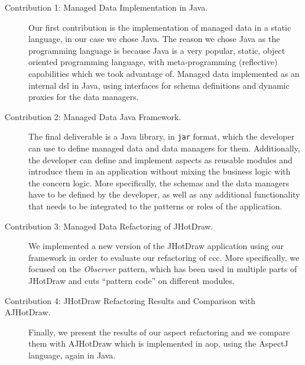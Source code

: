 \begin{description}
  \item[Contribution 1: Managed Data Implementation in Java.]
  Our first contribution is the implementation of managed data in a static language, in our case we chose Java.
  The reason we chose Java as the programming language is because Java is a very popular, static, object oriented programming language, with meta-programming (reflective) capabilities which we took advantage of.
  Managed data implemented as an internal \ac{dsl} in Java, using interfaces for schema definitions and dynamic proxies for the data managers.

  \item[Contribution 2: Managed Data Java Framework.]
  The final deliverable is a Java library, in \texttt{jar} format, which the developer can use to define managed data and data managers for them. 
  Additionally, the developer can define and implement aspects as reusable modules and introduce them in an application without mixing the business logic with the concern logic. 
  More specifically, the schemas and the data managers have to be defined by the developer, as well as any additional functionality that needs to be integrated to the patterns or roles of the application.

  \item[Contribution 3: Managed Data Refactoring of JHotDraw.]
  We implemented a new version of the JHotDraw application using our framework in order to evaluate our refactoring of \ac{ccc}.
  More specifically, we focused on the \textit{Observer} pattern, which has been used in multiple parts of JHotDraw and cuts ``pattern code'' on different modules.

  \item[Contribution 4: JHotDraw Refactoring Results and Comparison with AJHotDraw.]
  Finally, we present the results of our aspect refactoring and we compare them with AJHotDraw which is implemented in \ac{aop}, using the AspectJ language, again in Java.

\end{description}

